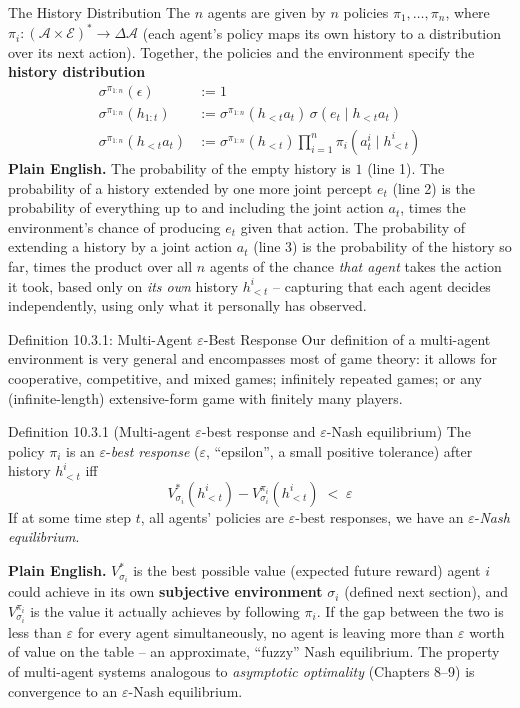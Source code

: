 \documentclass[aspectratio=169,10pt]{beamer}
\newcommand{\Ac}{\mathcal{A}}
\newcommand{\Ec}{\mathcal{E}}
\begin{document}
\begin{frame}{The History Distribution}
  The $n$ agents are given by $n$ policies $\pi_1,\ldots,\pi_n$, where
  $\pi_i:(\Ac\times\Ec)^*\to\Delta\Ac$ (each agent's policy maps its own
  history to a distribution over its next action). Together, the policies
  and the environment specify the \textbf{history distribution}
  \begin{align*}
    \sigma^{\pi_{1:n}}(\epsilon) &:= 1 \\
    \sigma^{\pi_{1:n}}(h_{1:t}) &:= \sigma^{\pi_{1:n}}(h_{<t}a_t)\,\sigma(e_t\mid h_{<t}a_t) \\
    \sigma^{\pi_{1:n}}(h_{<t}a_t) &:= \sigma^{\pi_{1:n}}(h_{<t})\prod_{i=1}^n \pi_i(a_t^i\mid h_{<t}^i)
  \end{align*}
  \textbf{Plain English.} The probability of the empty history is $1$
  (line 1). The probability of a history extended by one more joint
  percept $e_t$ (line 2) is the probability of everything up to and
  including the joint action $a_t$, times the environment's chance of
  producing $e_t$ given that action. The probability of extending a
  history by a joint action $a_t$ (line 3) is the probability of the
  history so far, times the product over all $n$ agents of the chance
  \emph{that agent} takes the action it took, based only on \emph{its own}
  history $h_{<t}^i$ -- capturing that each agent decides independently,
  using only what it personally has observed.
\end{frame}

\begin{frame}{Definition 10.3.1: Multi-Agent $\varepsilon$-Best Response}
  Our definition of a multi-agent environment is very general and
  encompasses most of game theory: it allows for cooperative,
  competitive, and mixed games; infinitely repeated games; or any
  (infinite-length) extensive-form game with finitely many players.

  \begin{block}{Definition 10.3.1 (Multi-agent $\varepsilon$-best response and $\varepsilon$-Nash equilibrium)}
    The policy $\pi_i$ is an $\varepsilon$-\emph{best response}
    ($\varepsilon$, ``epsilon'', a small positive tolerance) after history
    $h_{<t}^i$ iff
    \[
      V^*_{\sigma_i}(h^i_{<t}) - V^{\pi_i}_{\sigma_i}(h^i_{<t}) \;<\; \varepsilon
    \]
    If at some time step $t$, all agents' policies are $\varepsilon$-best
    responses, we have an $\varepsilon$-\emph{Nash equilibrium}.
  \end{block}
  \textbf{Plain English.} $V^*_{\sigma_i}$ is the best possible value
  (expected future reward) agent $i$ could achieve in its own
  \textbf{subjective environment} $\sigma_i$ (defined next section), and
  $V^{\pi_i}_{\sigma_i}$ is the value it actually achieves by following
  $\pi_i$. If the gap between the two is less than $\varepsilon$ for every
  agent simultaneously, no agent is leaving more than $\varepsilon$ worth
  of value on the table -- an approximate, ``fuzzy'' Nash equilibrium. The
  property of multi-agent systems analogous to \emph{asymptotic
  optimality} (Chapters 8--9) is convergence to an $\varepsilon$-Nash
  equilibrium.
\end{frame}
\end{document}
